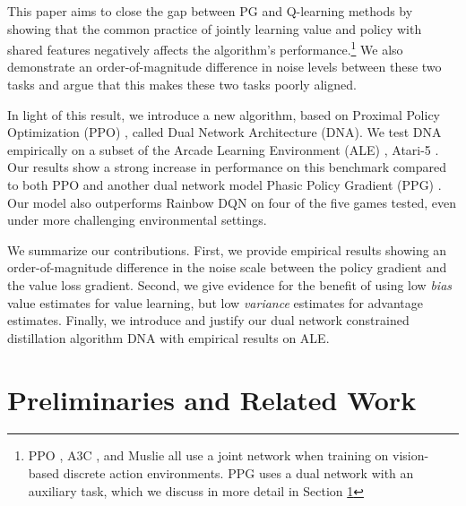 \documentclass{article}
\begin{document}
This paper aims to close the gap between PG and Q-learning methods by showing that the common practice of jointly learning value and policy with shared features negatively affects the algorithm's performance.\footnote{PPO \cite{schulman2017proximal}, A3C \cite{mnih2016asynchronous}, and Muslie \cite{hessel2021muesli} all use a joint network when training on vision-based discrete action environments. PPG \cite{cobbe2021phasic} uses a dual network with an auxiliary task, which we discuss in more detail in Section \ref{sec:background}} We also demonstrate an order-of-magnitude difference in noise levels between these two tasks and argue that this makes these two tasks poorly aligned.

In light of this result, we introduce a new algorithm, based on Proximal Policy Optimization (PPO) \cite{schulman2017proximal}, called Dual Network Architecture (DNA). We test DNA empirically on a subset of the Arcade Learning Environment (ALE) \cite{bellemare2013arcade}, Atari-5 \cite{aitchison2022atari}.  Our results show a strong increase in performance on this benchmark compared to both PPO and another dual network model Phasic Policy Gradient (PPG) \cite{cobbe2021phasic}. Our model also outperforms Rainbow DQN \cite{hessel2018rainbow} on four of the five games tested, even under more challenging environmental settings. 

We summarize our contributions. First, we provide empirical results showing an order-of-magnitude difference in the noise scale between the policy gradient and the value loss gradient. Second, we give evidence for the benefit of using low \textit{bias} value estimates for value learning, but low \textit{variance} estimates for advantage estimates. Finally, we introduce and justify our dual network constrained distillation algorithm DNA with empirical results on ALE.
 
\section{Preliminaries and Related Work}
\label{sec:background}
\end{document}
